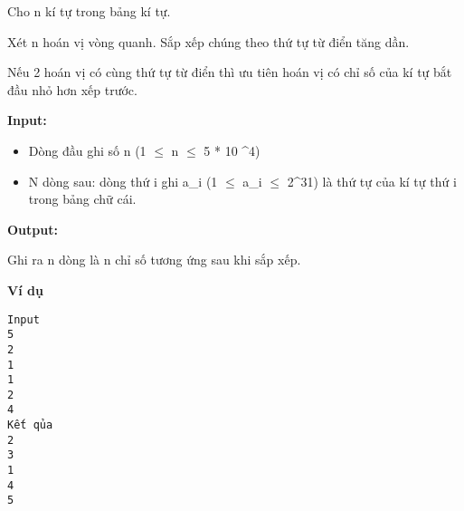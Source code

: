 

Cho n kí tự trong bảng kí tự.

Xét n hoán vị vòng quanh. Sắp xếp chúng theo thứ tự từ điển tăng dần.

Nếu 2 hoán vị có cùng thứ tự từ điển thì ưu tiên hoán vị có chỉ số của kí tự bắt đầu nhỏ hơn xếp trước.

\textbf{Input:}
\begin{itemize}
	\item Dòng đầu ghi số n (1 $\le$  n  $\le$  5 * 10 \textasciicircum 4)
	\item N dòng sau: dòng thứ i ghi a\_i (1  $\le$  a\_i  $\le$  2\textasciicircum31) là thứ tự của kí tự thứ i trong bảng chữ cái.
\end{itemize}

\textbf{Output:}

Ghi ra n dòng là n chỉ số tương ứng sau khi sắp xếp.

\textbf{Ví dụ}
\begin{verbatim}
Input
5
2
1
1
2
4
Kết qủa
2
3
1
4
5\end{verbatim}
